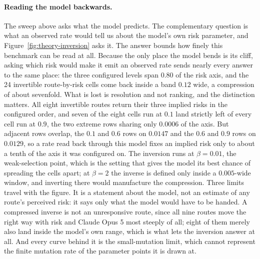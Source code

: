 \documentclass{article}
\begin{document}
\paragraph{Reading the model backwards.} The sweep above asks what the model
predicts. The complementary question is what an observed rate would tell us
about the model's own risk parameter, and Figure~\ref{fig:theory-inversion}
asks it. The answer bounds how finely this benchmark can be read at all.
Because the only place the model bends is its cliff, asking which risk would
make it emit an observed rate sends nearly every answer to the same place: the
three configured levels span $0.80$ of the risk axis, and the 24 invertible
route-by-risk cells come back inside a band $0.12$ wide, a compression of about
sevenfold. What is lost is resolution and not ranking, and the distinction
matters. All eight invertible routes return their three implied risks in the
configured order, and seven of the eight cells run at $0.1$ land strictly left
of every cell run at $0.9$, the two extreme rows sharing only $0.0006$ of the
axis. But adjacent rows overlap, the $0.1$ and $0.6$ rows on $0.0147$ and the
$0.6$ and $0.9$ rows on $0.0129$, so a rate read back through this model fixes
an implied risk only to about a tenth of the axis it was configured on. The
inversion runs at
$\beta = 0.01$, the weak-selection point, which is the setting that gives the
model its best chance of spreading the cells apart; at $\beta = 2$ the inverse
is defined only inside a $0.005$-wide window, and inverting there would
manufacture the compression. Three limits travel with the figure. It is a
statement about the model, not an estimate of any route's perceived risk: it
says only what the model would have to be handed. A compressed inverse is not
an unresponsive route, since all nine routes move the right way with risk and
Claude Opus 5 most steeply of all; eight of them merely also land inside the
model's own range, which is what lets the inversion answer at all. And every
curve behind it is the small-mutation limit, which cannot represent the finite
mutation rate of the parameter points it is drawn at.
\end{document}
